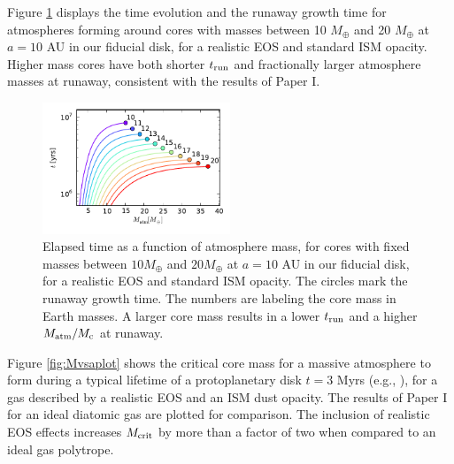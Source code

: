 \documentclass[apj]{emulateapj}
\newcommand{\co}{_{\rm c}}
\begin{document}

Figure \ref{fig:tvsMplot} displays the time evolution and the runaway growth time for atmospheres forming around cores with masses between 10 $M_{\oplus}$ and 20 $M_{\oplus}$ at $a=10$ AU in our fiducial disk, for a realistic EOS and standard ISM opacity. Higher mass cores have both shorter $t_{\rm run}$ and fractionally larger atmosphere masses at runaway, consistent with the results of Paper I. 

\begin{figure}[h!]
\centering
\includegraphics[width=0.5\textwidth]{../../figs/ModelAtmospheres/RadSelfGravRealEOS/PaperFigs/t_vs_M_10au.pdf}
\caption{Elapsed time as a function of atmosphere mass, for cores with fixed masses between $10 M_{\oplus}$ and $20 M_{\oplus}$ at $a=10$ AU in our fiducial disk, for a realistic EOS and standard ISM opacity. The circles mark the runaway growth time. The numbers are labeling the core mass in Earth masses. A larger core mass results in a lower $t_{\rm run}$ and a higher $M_{\rm atm}/M\co$ at runaway.}
\label{fig:tvsMplot}
\end{figure}



Figure \ref{fig:Mvsaplot} shows the critical core mass for a massive atmosphere to form during a typical lifetime of a protoplanetary disk $t=3$ Myrs (e.g., \citealt{jay99}), for a gas described by a realistic EOS and an ISM dust opacity. The results of Paper I for an ideal diatomic gas are plotted for comparison. The inclusion of realistic EOS effects increases $M_{\rm crit}$ by more than a factor of two when compared to an ideal gas polytrope. %
\end{document}
